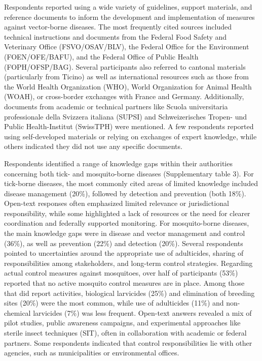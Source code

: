 \documentclass[
  11pt,
]{article}
\begin{document}
Respondents reported using a wide variety of guidelines, support
materials, and reference documents to inform the development and
implementation of measures against vector-borne diseases. The most
frequently cited sources included technical instructions and documents
from the Federal Food Safety and Veterinary Office (FSVO/OSAV/BLV), the
Federal Office for the Environment (FOEN/OFE/BAFU), and the Federal
Office of Public Health (FOPH/OFSP/BAG). Several participants also
referred to cantonal materials (particularly from Ticino) as well as
international resources such as those from the World Health Organization
(WHO), World Organization for Animal Health (WOAH), or cross-border
exchanges with France and Germany. Additionally, documents from academic
or technical partners like Scuola universitaria professionale della
Svizzera italiana (SUPSI) and Schweizerisches Tropen- und Public
Health-Institut (SwissTPH) were mentioned. A few respondents reported
using self-developed materials or relying on exchanges of expert
knowledge, while others indicated they did not use any specific
documents.

Respondents identified a range of knowledge gaps within their
authorities concerning both tick- and mosquito-borne diseases
(Supplementary table 3). For tick-borne diseases, the most commonly
cited areas of limited knowledge included disease management (20\%),
followed by detection and prevention (both 18\%). Open-text responses
often emphasized limited relevance or jurisdictional responsibility,
while some highlighted a lack of resources or the need for clearer
coordination and federally supported monitoring. For mosquito-borne
diseases, the main knowledge gaps were in disease and vector management
and control (36\%), as well as prevention (22\%) and detection (20\%).
Several respondents pointed to uncertainties around the appropriate use
of adulticides, sharing of responsibilities among stakeholders, and
long-term control strategies. Regarding actual control measures against
mosquitoes, over half of participants (53\%) reported that no active
mosquito control measures are in place. Among those that did report
activities, biological larvicides (25\%) and elimination of breeding
sites (20\%) were the most common, while use of adulticides (11\%) and
non-chemical larvicides (7\%) was less frequent. Open-text answers
revealed a mix of pilot studies, public awareness campaigns, and
experimental approaches like sterile insect techniques (SIT), often in
collaboration with academic or federal partners. Some respondents
indicated that control responsibilities lie with other agencies, such as
municipalities or environmental offices.
\end{document}

